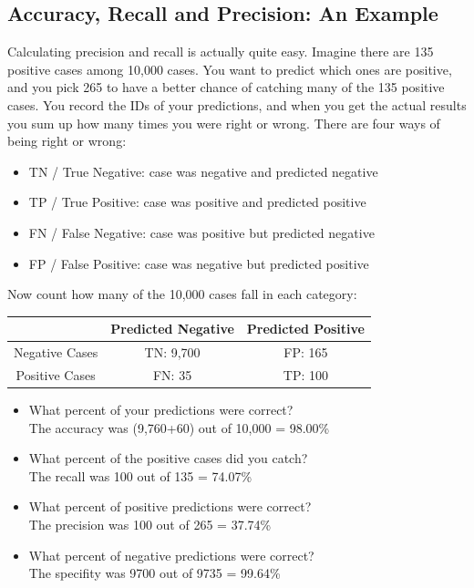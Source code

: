 \documentclass[]{report}
\begin{document}
\subsection*{Accuracy, Recall and Precision: An Example}
Calculating precision and recall is actually quite easy. Imagine there are
135 positive cases among 10,000 cases. You want to predict which ones are
positive, and you pick 265 to have a better chance of catching many of the
135 positive cases. You record the IDs of your predictions, and when you
get the actual results you sum up how many times you were right or wrong.
There are four ways of being right or wrong:
\begin{itemize}
\item TN / True Negative: case was negative and predicted negative
\item TP / True Positive: case was positive and predicted positive
\item  FN / False Negative: case was positive but predicted negative
\item FP / False Positive: case was negative but predicted positive
\end{itemize}
Now count how many of the 10,000 cases fall in each category:
\begin{center}
\begin{tabular}{|c|c|c|} \hline
  & Predicted Negative & Predicted Positive \\ \hline
Negative Cases & TN: 9,700 & FP: 165 \\ \hline
Positive Cases &  FN: 35 & TP: 100 \\ \hline
\end{tabular}
\end{center}

\begin{itemize}
	\item What percent of your predictions were correct? \\The accuracy was (9,760+60) out of 10,000 = 98.00\%
	\item	What percent of the positive cases did you catch?\\
 The recall was 100 out of 135 = 74.07\%
	\item	What percent of positive predictions were correct?\\
 The precision was 100 out of 265 = 37.74\%
	\item 	What percent of negative predictions were correct?\\
 The specifity was 9700 out of 9735 = 99.64\%
\end{itemize}
\end{document}
